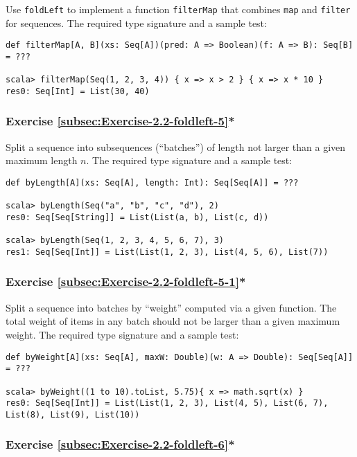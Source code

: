 Use \lstinline!foldLeft! to implement a function \lstinline!filterMap!
that combines \lstinline!map! and \lstinline!filter! for sequences.
The required type signature and a sample test:
\begin{lstlisting}
def filterMap[A, B](xs: Seq[A])(pred: A => Boolean)(f: A => B): Seq[B] = ???

scala> filterMap(Seq(1, 2, 3, 4)) { x => x > 2 } { x => x * 10 }
res0: Seq[Int] = List(30, 40)
\end{lstlisting}


\subsubsection{Exercise \label{subsec:Exercise-2.2-foldleft-5}\ref{subsec:Exercise-2.2-foldleft-5}{*}}

Split a sequence into subsequences (\textsf{``}batches\textsf{''}) of length not larger
than a given maximum length $n$. The required type signature and
a sample test:
\begin{lstlisting}
def byLength[A](xs: Seq[A], length: Int): Seq[Seq[A]] = ???

scala> byLength(Seq("a", "b", "c", "d"), 2)
res0: Seq[Seq[String]] = List(List(a, b), List(c, d))

scala> byLength(Seq(1, 2, 3, 4, 5, 6, 7), 3)
res1: Seq[Seq[Int]] = List(List(1, 2, 3), List(4, 5, 6), List(7))
\end{lstlisting}


\subsubsection{Exercise \label{subsec:Exercise-2.2-foldleft-5-1}\ref{subsec:Exercise-2.2-foldleft-5-1}{*}}

Split a sequence into batches by \textsf{``}weight\textsf{''} computed via a given
function. The total weight of items in any batch should not be larger
than a given maximum weight. The required type signature and a sample
test:
\begin{lstlisting}
def byWeight[A](xs: Seq[A], maxW: Double)(w: A => Double): Seq[Seq[A]] = ???

scala> byWeight((1 to 10).toList, 5.75){ x => math.sqrt(x) }
res0: Seq[Seq[Int]] = List(List(1, 2, 3), List(4, 5), List(6, 7), List(8), List(9), List(10))
\end{lstlisting}


\subsubsection{Exercise \label{subsec:Exercise-2.2-foldleft-6}\ref{subsec:Exercise-2.2-foldleft-6}{*}}

